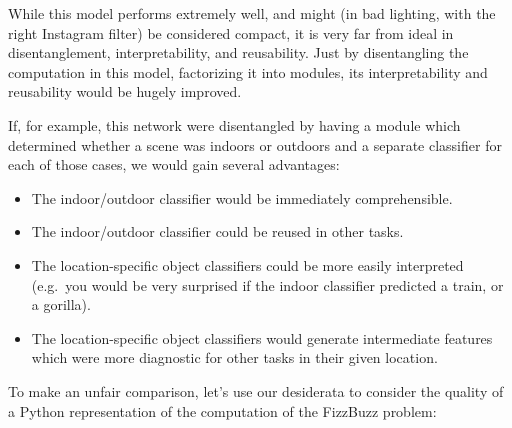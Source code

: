 \documentclass[12pt,twoside]{mitthesis}
\newenvironment{Shaded}{}{}
\newcommand{\KeywordTok}[1]{\textcolor[rgb]{0.00,0.44,0.13}{\textbf{{#1}}}}
\newcommand{\DecValTok}[1]{\textcolor[rgb]{0.25,0.63,0.44}{{#1}}}
\newcommand{\CharTok}[1]{\textcolor[rgb]{0.25,0.44,0.63}{{#1}}}
\newcommand{\StringTok}[1]{\textcolor[rgb]{0.25,0.44,0.63}{{#1}}}
\newcommand{\ControlFlowTok}[1]{\textcolor[rgb]{0.00,0.44,0.13}{\textbf{{#1}}}}
\newcommand{\OperatorTok}[1]{\textcolor[rgb]{0.40,0.40,0.40}{{#1}}}
\newcommand{\BuiltInTok}[1]{{#1}}
\newcommand{\NormalTok}[1]{{#1}}
\providecommand{\tightlist}{%
  \setlength{\itemsep}{0pt}\setlength{\parskip}{0pt}}
\begin{document}
While this model performs extremely well, and might (in bad lighting,
with the right Instagram filter) be considered compact, it is very far
from ideal in disentanglement, interpretability, and reusability. Just
by disentangling the computation in this model, factorizing it into
modules, its interpretability and reusability would be hugely improved.

If, for example, this network were disentangled by having a module which
determined whether a scene was indoors or outdoors and a separate
classifier for each of those cases, we would gain several advantages:

\begin{itemize}
\tightlist
\item
  The indoor/outdoor classifier would be immediately comprehensible.
\item
  The indoor/outdoor classifier could be reused in other tasks.
\item
  The location-specific object classifiers could be more easily
  interpreted (e.g.~you would be very surprised if the indoor classifier
  predicted a train, or a gorilla).
\item
  The location-specific object classifiers would generate intermediate
  features which were more diagnostic for other tasks in their given
  location.
\end{itemize}

To make an unfair comparison, let's use our desiderata to consider the
quality of a Python representation of the computation of the FizzBuzz
problem:

\hypertarget{lst:fizzbuzz}{\label{lst:fizzbuzz}}
\begin{Shaded}
\end{Shaded}
\end{document}
